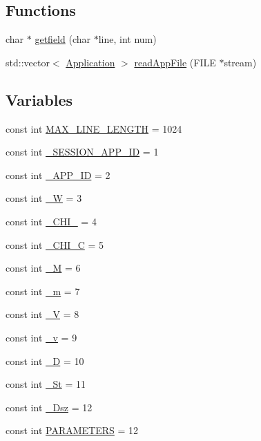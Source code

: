\subsection*{Functions}
\begin{DoxyCompactItemize}
\item 
char $\ast$ \hyperlink{read__app__file_8hh_a28f2319f14673125b080c828eac27d7a}{getfield} (char $\ast$line, int num)
\item 
std\-::vector$<$ \hyperlink{classApplication}{Application} $>$ \hyperlink{read__app__file_8hh_aa73d7abbbef707bf918fbef4c1942cae}{read\-App\-File} (F\-I\-L\-E $\ast$stream)
\end{DoxyCompactItemize}
\subsection*{Variables}
\begin{DoxyCompactItemize}
\item 
const int \hyperlink{read__app__file_8hh_a2bed00245e126b4eff6914757499fa03}{M\-A\-X\-\_\-\-L\-I\-N\-E\-\_\-\-L\-E\-N\-G\-T\-H} = 1024
\item 
const int \hyperlink{read__app__file_8hh_a59a9ce5ac71fc3cf0cc8212f0b504ae6}{\-\_\-\-S\-E\-S\-S\-I\-O\-N\-\_\-\-A\-P\-P\-\_\-\-I\-D} = 1
\item 
const int \hyperlink{read__app__file_8hh_ae51a28367bc6544652422f59006f3b6b}{\-\_\-\-A\-P\-P\-\_\-\-I\-D} = 2
\item 
const int \hyperlink{read__app__file_8hh_a4aa1b73d64e16b578c6136709b6eb029}{\-\_\-\-W} = 3
\item 
const int \hyperlink{read__app__file_8hh_acfba94652d778a11a425f12218456d94}{\-\_\-\-C\-H\-I\-\_} = 4
\item 
const int \hyperlink{read__app__file_8hh_a86b2515e0c385f2faeb430c4cde8d9c7}{\-\_\-\-C\-H\-I\-\_\-\-C} = 5
\item 
const int \hyperlink{read__app__file_8hh_a4de4eab3d42e1216f709ece03e79b89e}{\-\_\-\-M} = 6
\item 
const int \hyperlink{read__app__file_8hh_a6205ea88780b1fb687eb5edfef6e1663}{\-\_\-m} = 7
\item 
const int \hyperlink{read__app__file_8hh_a3b254b25919d11b76feba8a02df2d89a}{\-\_\-\-V} = 8
\item 
const int \hyperlink{read__app__file_8hh_aa2bb9d7b455dc30a636a24b582d6a95b}{\-\_\-v} = 9
\item 
const int \hyperlink{read__app__file_8hh_a74e35f00d77d6fce2a39b0a0d5dbab08}{\-\_\-\-D} = 10
\item 
const int \hyperlink{read__app__file_8hh_afc86f016ce8337f4bb2dbc5b1dc114b3}{\-\_\-\-St} = 11
\item 
const int \hyperlink{read__app__file_8hh_a93952cfaa3c3a86172f423e065dc3a3c}{\-\_\-\-Dsz} = 12
\item 
const int \hyperlink{read__app__file_8hh_a4ebe0e540828a47ec24697bf0be11fe8}{P\-A\-R\-A\-M\-E\-T\-E\-R\-S} = 12
\end{DoxyCompactItemize}


